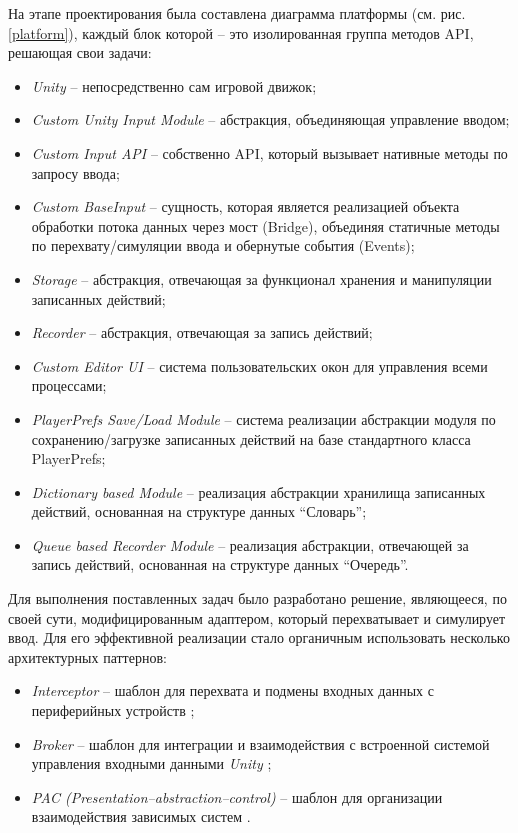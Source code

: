 На этапе проектирования была составлена диаграмма платформы (см. рис. \ref{platform}), каждый блок которой -- это изолированная группа методов API, решающая свои задачи: 
\begin{itemize}
	\item \textit{Unity} -- непосредственно сам игровой движок;
	\item \textit{Custom Unity Input Module} -- абстракция, объединяющая управление вводом;
	\item \textit{Custom Input API} -- собственно API, который вызывает нативные методы по запросу ввода;
	\item \textit{Custom BaseInput} --  сущность, которая является реализацией объекта обработки потока данных через мост (Bridge), объединяя статичные методы по перехвату/симуляции ввода и обернутые события (Events);
	\item \textit{Storage} --  абстракция, отвечающая за функционал хранения и манипуляции записанных действий;
	\item \textit{Recorder} -- абстракция, отвечающая за запись действий;
	\item \textit{Custom Editor UI} -- система пользовательских окон для управления всеми процессами;
	\item \textit{PlayerPrefs Save/Load Module} -- система реализации абстракции модуля по сохранению/загрузке записанных действий на базе стандартного класса PlayerPrefs;
	\item \textit{Dictionary based Module} -- реализация абстракции хранилища записанных действий, основанная на структуре данных ``Словарь'';
	\item \textit{Queue based Recorder Module} -- реализация абстракции, отвечающей за запись действий, основанная на структуре данных ``Очередь''.
\end{itemize}

Для выполнения поставленных задач было разработано решение, являющееся, по своей сути, модифицированным адаптером, который перехватывает и симулирует ввод. Для его эффективной реализации стало органичным использовать несколько архитектурных паттернов:
\begin{itemize}
	\item
	\textit{Interceptor} -- шаблон для перехвата и подмены входных данных с периферийных устройств \cite{interceptor};
	\item
	\textit{Broker} -- шаблон для интеграции и взаимодействия с встроенной системой управления входными данными \textit{Unity} \cite{broker};
	\item
	\textit{PAC (Presentation–abstraction–control)} -- шаблон для организации взаимодействия зависимых систем \cite{pac}.
\end{itemize}

